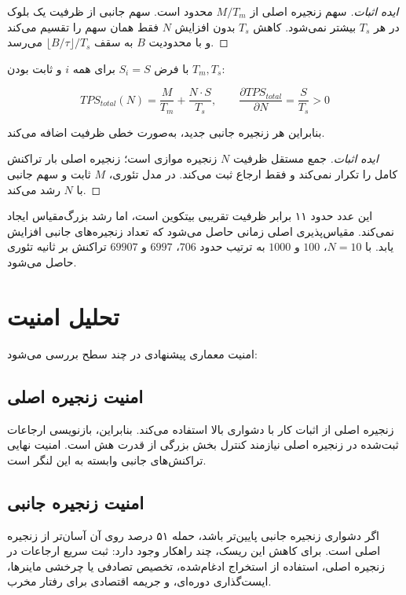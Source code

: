 \begin{proof}[ایده اثبات]
سهم زنجیره اصلی از \(M/T_m\) محدود است. سهم جانبی از ظرفیت یک بلوک در هر \(T_s\) بیشتر نمی‌شود. کاهش \(T_s\) بدون افزایش \(N\) فقط همان سهم را تقسیم می‌کند و با محدودیت \(B\) به سقف \(\lfloor B/\tau \rfloor/T_s\) می‌رسد.
\end{proof}

\begin{theorem}
\label{thm:linear-scaling}
با فرض \(S_i=S\) برای همه \(i\) و ثابت بودن \(T_m,T_s\):
\begin{latin}
\[
TPS_{total}(N) = \frac{M}{T_m} + \frac{N \cdot S}{T_s}, \qquad
\frac{\partial TPS_{total}}{\partial N} = \frac{S}{T_s} > 0
\]
\end{latin}
بنابراین هر زنجیره جانبی جدید، به‌صورت خطی ظرفیت اضافه می‌کند.
\end{theorem}

\begin{proof}[ایده اثبات]
جمع مستقل ظرفیت \(N\) زنجیره موازی است؛ زنجیره اصلی بار تراکنش کامل را تکرار نمی‌کند و فقط ارجاع ثبت می‌کند. در مدل تئوری، \(M\) ثابت و سهم جانبی با \(N\) رشد می‌کند.
\end{proof}

این عدد حدود ۱۱ برابر ظرفیت تقریبی بیتکوین است، اما رشد بزرگ‌مقیاس ایجاد نمی‌کند. مقیاس‌پذیری اصلی زمانی حاصل می‌شود که تعداد زنجیره‌های جانبی افزایش یابد. با \(N=10\)، \(100\) و \(1000\) به ترتیب حدود \(706\)، \(6997\) و \(69907\) تراکنش بر ثانیه تئوری حاصل می‌شود.

\section{تحلیل امنیت}

امنیت معماری پیشنهادی در چند سطح بررسی می‌شود:

\subsection{امنیت زنجیره اصلی}

زنجیره اصلی از اثبات کار با دشواری بالا استفاده می‌کند. بنابراین، بازنویسی ارجاعات ثبت‌شده در زنجیره اصلی نیازمند کنترل بخش بزرگی از قدرت هش است. امنیت نهایی تراکنش‌های جانبی وابسته به این لنگر است.

\subsection{امنیت زنجیره جانبی}

اگر دشواری زنجیره جانبی پایین‌تر باشد، حمله ۵۱ درصد روی آن آسان‌تر از زنجیره اصلی است. برای کاهش این ریسک، چند راهکار وجود دارد: ثبت سریع ارجاعات در زنجیره اصلی، استفاده از استخراج ادغام‌شده، تخصیص تصادفی یا چرخشی ماینرها، ایست‌گذاری دوره‌ای، و جریمه اقتصادی برای رفتار مخرب.

